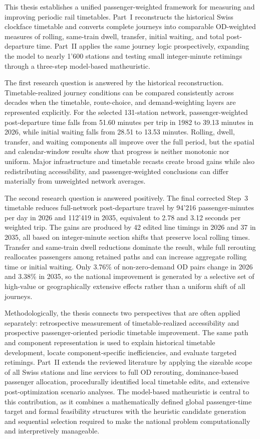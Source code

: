 \documentclass[preprint,12pt]{elsarticle}
\begin{document}
This thesis establishes a unified passenger-weighted framework for measuring and improving periodic rail timetables. Part~I reconstructs the historical Swiss clockface timetable and converts complete journeys into comparable OD-weighted measures of rolling, same-train dwell, transfer, initial waiting, and total post-departure time. Part~II applies the same journey logic prospectively, expanding the model to nearly 1'600 stations and testing small integer-minute retimings through a three-step model-based matheuristic.

The first research question is answered by the historical reconstruction. Timetable-realized journey conditions can be compared consistently across decades when the timetable, route-choice, and demand-weighting layers are represented explicitly. For the selected 131-station network, passenger-weighted post-departure time falls from 51.60 minutes per trip in 1982 to 39.13 minutes in 2026, while initial waiting falls from 28.51 to 13.53 minutes. Rolling, dwell, transfer, and waiting components all improve over the full period, but the spatial and calendar-window results show that progress is neither monotonic nor uniform. Major infrastructure and timetable recasts create broad gains while also redistributing accessibility, and passenger-weighted conclusions can differ materially from unweighted network averages.

The second research question is answered positively. The final corrected Step~3 timetable reduces full-network post-departure travel by 94'216 passenger-minutes per day in 2026 and 112'419 in 2035, equivalent to 2.78 and 3.12 seconds per weighted trip. The gains are produced by 42 edited line timings in 2026 and 37 in 2035, all based on integer-minute section shifts that preserve local rolling times. Transfer and same-train dwell reductions dominate the result, while full rerouting reallocates passengers among retained paths and can increase aggregate rolling time or initial waiting. Only 3.76\% of non-zero-demand OD pairs change in 2026 and 3.38\% in 2035, so the national improvement is generated by a selective set of high-value or geographically extensive effects rather than a uniform shift of all journeys.

Methodologically, the thesis connects two perspectives that are often applied separately: retrospective measurement of timetable-realized accessibility and prospective passenger-oriented periodic timetable improvement. The same path and component representation is used to explain historical timetable development, locate component-specific inefficiencies, and evaluate targeted retimings. Part~II extends the reviewed literature by applying the sizeable scope of all Swiss stations and line services to full OD rerouting, dominance-based passenger allocation, procedurally identified local timetable edits, and extensive post-optimization scenario analyses. The model-based matheuristic is central to this contribution, as it combines a mathematically defined global passenger-time target and formal feasibility structures with the heuristic candidate generation and sequential selection required to make the national problem computationally and interpretively manageable.
\end{document}
